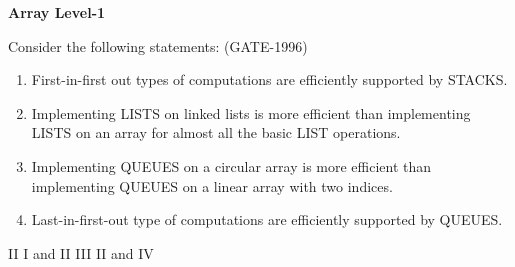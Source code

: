 \centerline{\textbf{ \LARGE Array Level-1}}

\begin{questyle}
  \question  Consider the following statements:  (GATE-1996)
    \begin{enumerate}
        \item First-in-first out types of computations are efficiently supported by STACKS.
        \item Implementing LISTS on linked lists is more efficient than implementing LISTS on an array for almost all the basic LIST operations.
        \item Implementing QUEUES on a circular array is more efficient than implementing QUEUES on a linear array with two indices.
        \item Last-in-first-out type of computations are efficiently supported by QUEUES.
    \end{enumerate}

  \begin{oneparchoices}
    \choice         II
    \choice         I and II
    \CorrectChoice  III
    \choice         II and IV
  \end{oneparchoices}
\end{questyle}
